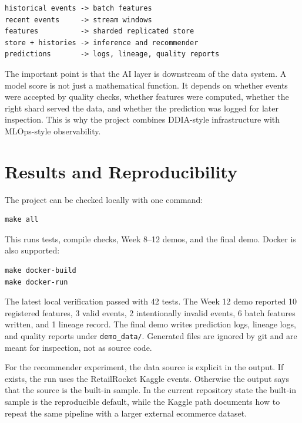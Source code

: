 \begin{lstlisting}
historical events -> batch features
recent events     -> stream windows
features          -> sharded replicated store
store + histories -> inference and recommender
predictions       -> logs, lineage, quality reports
\end{lstlisting}

The important point is that the AI layer is downstream of the data system. A
model score is not just a mathematical function. It depends on whether events
were accepted by quality checks, whether features were computed, whether the
right shard served the data, and whether the prediction was logged for later
inspection. This is why the project combines DDIA-style infrastructure with
MLOps-style observability.

\section{Results and Reproducibility}\label{sec:results}

The project can be checked locally with one command:

\begin{lstlisting}
make all
\end{lstlisting}

This runs tests, compile checks, Week 8--12 demos, and the final demo. Docker is
also supported:

\begin{lstlisting}
make docker-build
make docker-run
\end{lstlisting}

The latest local verification passed with 42 tests. The Week 12 demo reported
10 registered features, 3 valid events, 2 intentionally invalid events, 6 batch
features written, and 1 lineage record. The final demo writes prediction logs,
lineage logs, and quality reports under \texttt{demo\_data/}. Generated files
are ignored by git and are meant for inspection, not as source code.

For the recommender experiment, the data source is explicit in the output. If
 exists, the run uses the RetailRocket
Kaggle events. Otherwise the output says that the source is the built-in sample.
In the current repository state the built-in sample is the reproducible default,
while the Kaggle path documents how to repeat the same pipeline with a larger
external ecommerce dataset.

